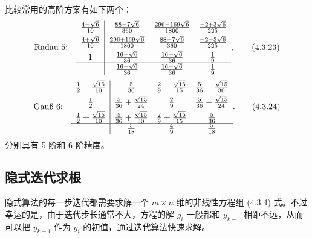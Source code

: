 比较常用的高阶方案有如下两个：
\begin{equation}
\text{Radau 5:}\quad
\begin{array}{c|ccc}
\frac{4-\sqrt6}{10}&\frac{88-7\sqrt6}{360}&\frac{296-169\sqrt6}{1800}&\frac{-2+3\sqrt6}{225}\\[4pt]
\frac{4+\sqrt6}{10}&\frac{296+169\sqrt6}{1800}&\frac{88+7\sqrt6}{360}&\frac{-2-3\sqrt6}{225}\\[4pt]
1&\frac{16-\sqrt6}{36}&\frac{16+\sqrt6}{36}&\frac19\\ \hline
&\frac{16-\sqrt6}{36}&\frac{16+\sqrt6}{36}&\frac19
\end{array},
\tag{4.3.23}
\end{equation}
\begin{equation}
\text{Gauß 6:}\quad
\begin{array}{c|ccc}
\frac12-\frac{\sqrt{15}}{10}&\frac5{36}&\frac29-\frac{\sqrt{15}}{15}&\frac5{36}-\frac{\sqrt{15}}{30}\\[4pt]
\frac12&\frac5{36}+\frac{\sqrt{15}}{24}&\frac29&\frac5{36}-\frac{\sqrt{15}}{24}\\[4pt]
\frac12+\frac{\sqrt{15}}{10}&\frac5{36}+\frac{\sqrt{15}}{30}&\frac29+\frac{\sqrt{15}}{15}&\frac5{36}\\ \hline
&\frac5{18}&\frac49&\frac5{18}
\end{array}.
\tag{4.3.24}
\end{equation}
分别具有 5 阶和 6 阶精度。

\subsection{隐式迭代求根}

隐式算法的每一步迭代都需要求解一个 $m\times n$ 维的非线性方程组 (4.3.4) 式。不过幸运的是，由于迭代步长通常不大，方程的解 $g_i$ 一般都和 $y_{k-1}$ 相距不远，从而可以把 $y_{k-1}$ 作为 $g_i$ 的初值，通过迭代算法快速求解。

